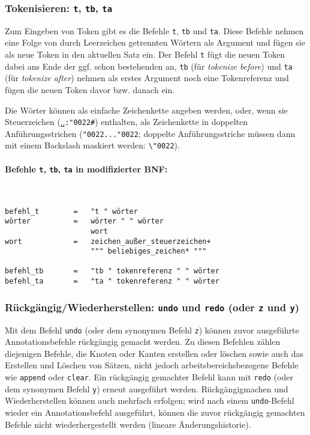 \documentclass[12pt]{scrartcl}
\newcommand{\quo}{\char"0022}
\begin{document}
\subsubsection{Tokenisieren: \texttt{t}, \texttt{tb}, \texttt{ta}}

Zum Eingeben von Token gibt es die Befehle \texttt{t}, \texttt{tb} und \texttt{ta}. Diese Befehle nehmen eine Folge von durch Leerzeichen getrennten Wörtern als Argument und fügen sie als neue Token in den aktuellen Satz ein. Der Befehl \texttt{t} fügt die neuen Token dabei ans Ende der ggf. schon bestehenden an, \texttt{tb} (für \textit{tokenize before}) und \texttt{ta} (für \textit{tokenize after}) nehmen als erstes Argument noch eine Tokenreferenz und fügen die neuen Token davor bzw. danach ein.

Die Wörter können als einfache Zeichenkette angeben werden, oder, wenn sie Steuerzeichen (\texttt{␣:\quo\#}) enthalten, als Zeichenkette in doppelten Anführungsstrichen (\texttt{\quo...\quo}; doppelte Anführungsstriche müssen dann mit einem Backslash maskiert werden: \texttt{\textbackslash\quo}).

\paragraph*{Befehle \texttt{t}, \texttt{tb}, \texttt{ta} in modifizierter BNF:}
~
\begin{framed}
\begin{lstlisting}
befehl_t        =   "t " wörter
wörter          =   wörter " " wörter
                    wort
wort            =   zeichen_außer_steuerzeichen+
                    """ beliebiges_zeichen* """

befehl_tb       =   "tb " tokenreferenz " " wörter
befehl_ta       =   "ta " tokenreferenz " " wörter
\end{lstlisting}
\end{framed}


\subsubsection{Rückgängig/Wiederherstellen: \texttt{undo} und \texttt{redo} (oder \texttt{z} und \texttt{y})}\label{befehl-undo}

Mit dem Befehl \texttt{undo} (oder dem synonymen Befehl \texttt{z}) können zuvor ausgeführte Annotationsbefehle rückgängig gemacht werden.
Zu diesen Befehlen zählen diejenigen Befehle, die Knoten oder Kanten erstellen oder löschen sowie auch das Erstellen und Löschen von Sätzen, nicht jedoch arbeitsbereichsbezogene Befehle wie \texttt{append} oder \texttt{clear}.
Ein rückgängig gemachter Befehl kann mit \texttt{redo} (oder dem synonymen Befehl \texttt{y}) erneut ausgeführt werden.
Rückgängigmachen und Wiederherstellen können auch mehrfach erfolgen; wird nach einem \texttt{undo}-Befehl wieder ein Annotationsbefehl ausgeführt, können die zuvor rückgängig gemachten Befehle nicht wiederhergestellt werden (lineare Änderungshistorie).
\end{document}
